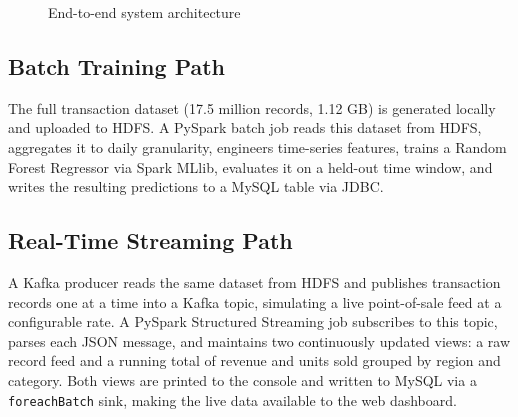 \documentclass[11pt]{article}
\begin{document}
\begin{figure}[H]
{%
}
\caption{End-to-end system architecture}
\label{fig:architecture}
\end{figure}

\subsection{Batch Training Path}

The full transaction dataset (17.5 million records, 1.12 GB) is generated locally and uploaded to HDFS. A PySpark batch job reads this dataset from HDFS, aggregates it to daily granularity, engineers time-series features, trains a Random Forest Regressor via Spark MLlib, evaluates it on a held-out time window, and writes the resulting predictions to a MySQL table via JDBC.

\subsection{Real-Time Streaming Path}

A Kafka producer reads the same dataset from HDFS and publishes transaction records one at a time into a Kafka topic, simulating a live point-of-sale feed at a configurable rate. A PySpark Structured Streaming job subscribes to this topic, parses each JSON message, and maintains two continuously updated views: a raw record feed and a running total of revenue and units sold grouped by region and category. Both views are printed to the console and written to MySQL via a \texttt{foreachBatch} sink, making the live data available to the web dashboard.
\end{document}

